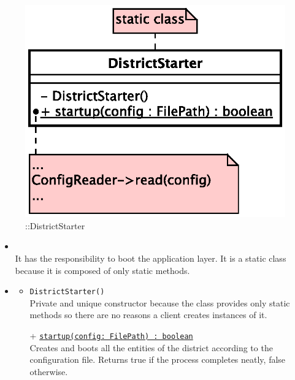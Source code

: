 \begin{figure}[h]
\centering
\includegraphics[scale=0.6,keepaspectratio]{images/solution/app/backend/district_starter.eps}
\caption{\pReactive::DistrictStarter}
\label{fig:sd-app-district-starter}
\end{figure}
\FloatBarrier
\begin{itemize}
  \item \textbf{\descr} \\
  It has the responsibility to boot the application layer.
  It is a static class because it is composed of only static methods.
  \item \textbf{\ops}
  \begin{itemize}
    \item \texttt{DistrictStarter()} \\
    Private and unique constructor because the class provides only static methods 
    so there are no reasons a client creates instances of it.
    \item[+] \texttt{\underline{startup(config: FilePath) : boolean}} \\
    Creates and boots all the entities of the district according to the 
    configuration file.
    Returns true if the process completes neatly, false otherwise.
  \end{itemize}
\end{itemize} 
